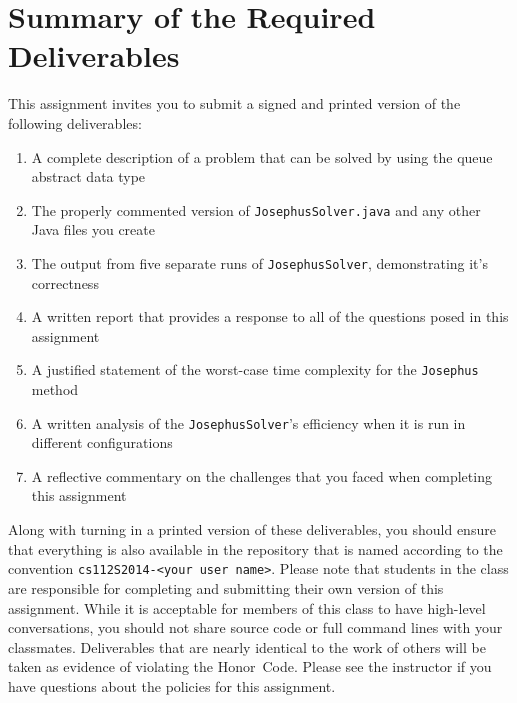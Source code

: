 \section*{Summary of the Required Deliverables}

  This assignment invites you to submit a signed and printed version of the following deliverables: 

  \begin{enumerate} 

  \item A complete description of a problem that can be solved by using the queue abstract data type

  \item The properly commented version of {\tt JosephusSolver.java} and any other Java files you create

  \item The output from five separate runs of {\tt JosephusSolver}, demonstrating it's correctness 

  \item A written report that provides a response to all of the questions posed in this assignment

  \item A justified statement of the worst-case time complexity for the {\tt Josephus} method

  \item A written analysis of the {\tt JosephusSolver}'s efficiency when it is run in different configurations 

  \item A reflective commentary on the challenges that you faced when completing this assignment 
   
  \end{enumerate}

  Along with turning in a printed version of these deliverables, you should ensure that everything is also available in
  the repository that is named according to the convention {\tt cs112S2014-<your user name>}. Please note that students
  in the class are responsible for completing and submitting their own version of this assignment.    While it is
  acceptable for members of this class to have high-level conversations, you should not share source code or full
  command lines with your classmates.  Deliverables that are nearly identical to the work of others will be taken as
  evidence of violating the \mbox{Honor Code}.  Please see the instructor if you have questions about the policies for
  this assignment.

  
